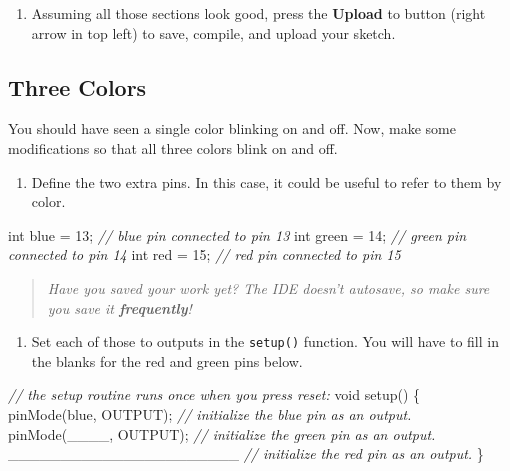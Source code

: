 \documentclass[]{book}
\newenvironment{Shaded}{\begin{snugshade}}{\end{snugshade}}
\newcommand{\CommentTok}[1]{\textcolor[rgb]{0.56,0.35,0.01}{\textit{#1}}}
\newcommand{\DataTypeTok}[1]{\textcolor[rgb]{0.13,0.29,0.53}{#1}}
\newcommand{\DecValTok}[1]{\textcolor[rgb]{0.00,0.00,0.81}{#1}}
\newcommand{\NormalTok}[1]{#1}
\providecommand{\tightlist}{%
  \setlength{\itemsep}{0pt}\setlength{\parskip}{0pt}}
\begin{document}
\begin{enumerate}
\def\labelenumi{\arabic{enumi}.}
\setcounter{enumi}{5}
\tightlist
\item
  Assuming all those sections look good, press the \textbf{Upload} to button (right arrow in top left) to save, compile, and upload your sketch.
\end{enumerate}

\hypertarget{three-colors}{%
\subsection{Three Colors}\label{three-colors}}

You should have seen a single color blinking on and off. Now, make some modifications so that all three colors blink on and off.

\begin{enumerate}
\def\labelenumi{\arabic{enumi}.}
\tightlist
\item
  Define the two extra pins. In this case, it could be useful to refer to them by color.
\end{enumerate}

\begin{Shaded}
\begin{Highlighting}[]
    \DataTypeTok{int}\NormalTok{ blue = }\DecValTok{13}\NormalTok{;   }\CommentTok{// blue pin connected to pin 13}
    \DataTypeTok{int}\NormalTok{ green = }\DecValTok{14}\NormalTok{;  }\CommentTok{// green pin connected to pin 14}
    \DataTypeTok{int}\NormalTok{ red = }\DecValTok{15}\NormalTok{;    }\CommentTok{// red pin connected to pin 15}
\end{Highlighting}
\end{Shaded}

\begin{quote}
\emph{Have you saved your work yet? The IDE doesn't autosave, so make sure you save it \textbf{frequently}!}
\end{quote}

\begin{enumerate}
\def\labelenumi{\arabic{enumi}.}
\setcounter{enumi}{1}
\tightlist
\item
  Set each of those to outputs in the \texttt{setup()} function. You will have to fill in the blanks for the red and green pins below.
\end{enumerate}

\begin{Shaded}
\begin{Highlighting}[]
  \CommentTok{// the setup routine runs once when you press reset:}
  \DataTypeTok{void}\NormalTok{ setup() \{                }
\NormalTok{    pinMode(blue, OUTPUT);     }\CommentTok{// initialize the blue pin as an output.}
\NormalTok{    pinMode(____, OUTPUT);     }\CommentTok{// initialize the green pin as an output.}
\NormalTok{    ______________________     }\CommentTok{// initialize the red pin as an output.}
\NormalTok{  \}}
\end{Highlighting}
\end{Shaded}
\end{document}
